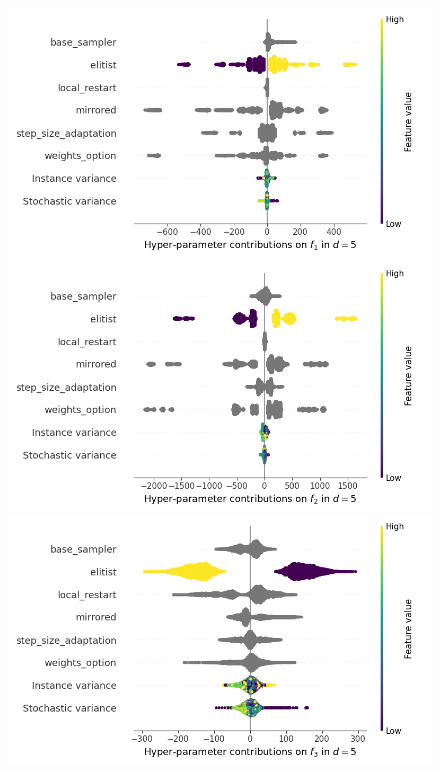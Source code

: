 \begin{figure}[t]
\centering
	\includegraphics[height=0.15\textheight,trim=0mm 0mm 30mm 0mm,clip]{images/img_summary_f1_d5.png}
	\includegraphics[height=0.15\textheight,trim=60mm 0mm 30mm 0mm,clip]{images/img_summary_f2_d5.png}
	\includegraphics[height=0.15\textheight,trim=60mm 0mm 30mm 0mm,clip]{images/img_summary_f3_d5.png}

\end{figure}
